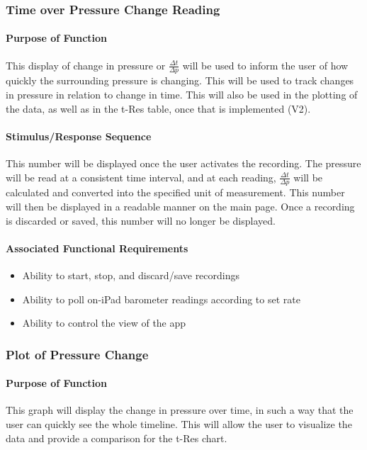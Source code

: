 \documentclass[onecolumn, draftclsnofoot,10pt, compsoc]{IEEEtran}
\begin{document}
\subsubsection{Time over Pressure Change Reading}
\paragraph{Purpose of Function}
This display of change in pressure or $\frac{\Delta t}{\Delta p}$ will be used to inform the user of how quickly the surrounding pressure is changing.
This will be used to track changes in pressure in relation to change in time.
This will also be used in the plotting of the data, as well as in the t-Res table, once that is implemented (V2).
\paragraph{Stimulus/Response Sequence}
This number will be displayed once the user activates the recording.
The pressure will be read at a consistent time interval, and at each reading, $\frac{\Delta t}{\Delta p}$ will be calculated and converted into the specified unit of measurement.
This number will then be displayed in a readable manner on the main page.
Once a recording is discarded or saved, this number will no longer be displayed.
\paragraph{Associated Functional Requirements}
\begin{itemize}
\item Ability to start, stop, and discard/save recordings
\item Ability to poll on-iPad barometer readings according to set rate
\item Ability to control the view of the app
\end{itemize}

\subsubsection{Plot of Pressure Change}
\paragraph{Purpose of Function}
This graph will display the change in pressure over time, in such a way that the user can quickly see the whole timeline.
This will allow the user to visualize the data and provide a comparison for the t-Res chart.
\end{document}
